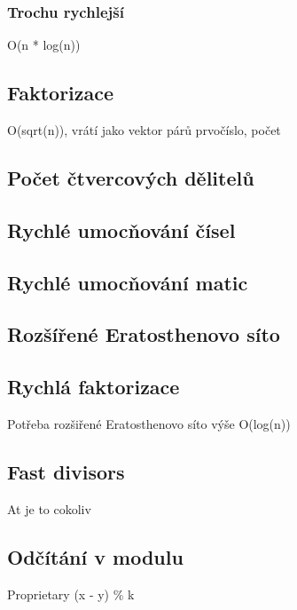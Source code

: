 \documentclass{article}
\begin{document}
\subsubsection{Trochu rychlejší}
O(n * log(n))


\subsection{Faktorizace}
O(sqrt(n)), vrátí jako vektor párů {prvočíslo, počet}


\subsection{Počet čtvercových dělitelů}


\subsection{Rychlé umocňování čísel}



\subsection{Rychlé umocňování matic}


\subsection{Rozšířené Eratosthenovo síto}


\subsection{Rychlá faktorizace}
Potřeba rozšiřené Eratosthenovo síto výše
O(log(n))


\subsection{Fast divisors}
At je to cokoliv


\subsection{Odčítání v modulu}
Proprietary (x - y) \% k

\end{document}
